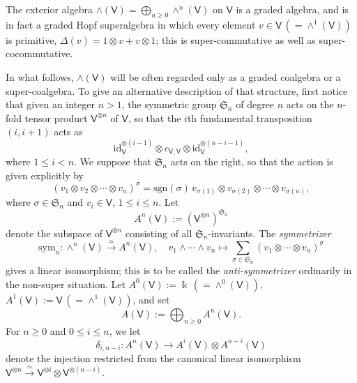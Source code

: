 \documentclass[11pt, a4paper]{amsart}
\theoremstyle{definition}
\numberwithin{equation}{section}
\begin{document}
The exterior algebra $\wedge(\mathsf{V}) = \bigoplus_{n \geq 0} \wedge^{n}(\mathsf{V})$ on $\mathsf{V}$ is a graded algebra, and is in fact a graded Hopf superalgebra in which every element $v \in \mathsf{V}\, (=\wedge^{1}(\mathsf{V}))$ is primitive, $\Delta(v) = 1\otimes v + v \otimes 1$; this is super-commutative as well as super-cocommutative.

In what follows, $\wedge(\mathsf{V})$ will be often regarded only as a graded coalgebra or a super-coalgebra.
To give an alternative description of that structure, first notice that given an integer $n > 1$, the symmetric group $\mathfrak{S}_{n}$ of degree $n$ acts on the $n$-fold tensor product $\mathsf{V}^{\otimes n}$ of $\mathsf{V}$, so that the $i$th fundamental transposition $(i, i+1)$ acts as
\[ \mathrm{id}_{\mathsf{V}}^{\otimes (i-1)} \otimes c_{\mathsf{V}, \mathsf{V}} \otimes \mathrm{id}_{\mathsf{V}}^{\otimes (n-i-1)}, \]
where $1 \leq i <n$.
We suppose that $\mathfrak{S}_n$ acts on the right, so that the action is given explicitly by
\[
(v_1\otimes v_2\otimes \cdots \otimes v_n)^{\sigma}=  \mathrm{sgn}(\sigma)\, 
v_{\sigma(1)}\otimes v_{\sigma(2)}\otimes\cdots \otimes v_{\sigma(n)},
\]
where $\sigma \in \mathfrak{S}_n$ and $v_i \in \mathsf{V}$, $1 \le i \le n$.
Let
\begin{equation}\label{E22}
A^{n}(\mathsf{V}):=(\mathsf{V}^{\otimes n})^{\mathfrak{S}_{n}}
\end{equation}
denote the subspace of $\mathsf{V}^{\otimes n}$ consisting of all $\mathfrak{S}_{n}$-invariants.
The \emph{symmetrizer}
\begin{equation}\label{E23}
\mathrm{sym}_{n}: \wedge^{n}(\mathsf{V}) \overset{\simeq}{\longrightarrow} A^{n}(\mathsf{V}),\quad v_{1} \wedge \cdots \wedge v_{n} \mapsto \sum_{\sigma \in \mathfrak{S}_n} (v_{1} \otimes \cdots \otimes v_{n})^{\sigma}
\end{equation}
gives a linear isomorphism; this is to be called the \emph{anti-symmetrizer} ordinarily in the non-super situation.
Let $A^{0}(\mathsf{V}) := \Bbbk\, (= \wedge^{0}(\mathsf{V}))$,\ $A^{1}(\mathsf{V}) := \mathsf{V}\, (= \wedge^{1}(\mathsf{V}))$, and set
\[ A(\mathsf{V}) := \bigoplus_{n \geq 0} A^{n}(\mathsf{V}). \]
For $n \geq 0$ and $0 \leq i \leq n$, we let
\begin{equation}\label{E23a}
\delta_{i, n-i}: A^{n}(\mathsf{V}) \to A^{i}(\mathsf{V}) \otimes A^{n-i}(\mathsf{V})
\end{equation}
denote the injection restricted from the canonical linear isomorphism $\mathsf{V}^{\otimes n} \overset{\simeq}{\longrightarrow} \mathsf{V}^{\otimes i} \otimes \mathsf{V}^{\otimes(n-i)}$.
\end{document}
